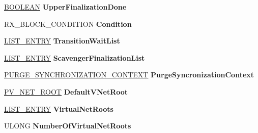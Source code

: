 \begin{DoxyCompactItemize}
\begin{tabbing}
\end{tabbing}\item 
\mbox{\label{struct___n_e_t___r_o_o_t_a55087becb2befd10856f97d06239aad6}} 
\hyperlink{_processor_bind_8h_a112e3146cb38b6ee95e64d85842e380a}{B\+O\+O\+L\+E\+AN} {\bfseries Upper\+Finalization\+Done}
\item 
\mbox{\label{struct___n_e_t___r_o_o_t_a96c908631dd527a2e1b5c10d39849bc3}} 
R\+X\+\_\+\+B\+L\+O\+C\+K\+\_\+\+C\+O\+N\+D\+I\+T\+I\+ON {\bfseries Condition}
\item 
\mbox{\label{struct___n_e_t___r_o_o_t_ab87260d2b31926640276a8044c64cace}} 
\hyperlink{struct___l_i_s_t___e_n_t_r_y}{L\+I\+S\+T\+\_\+\+E\+N\+T\+RY} {\bfseries Transition\+Wait\+List}
\item 
\mbox{\label{struct___n_e_t___r_o_o_t_a3838d38aee34eff37106d32ca253968a}} 
\hyperlink{struct___l_i_s_t___e_n_t_r_y}{L\+I\+S\+T\+\_\+\+E\+N\+T\+RY} {\bfseries Scavenger\+Finalization\+List}
\item 
\mbox{\label{struct___n_e_t___r_o_o_t_a68265088789984482137feb2bb67c995}} 
\hyperlink{struct___p_u_r_g_e___s_y_n_c_h_r_o_n_i_z_a_t_i_o_n___c_o_n_t_e_x_t}{P\+U\+R\+G\+E\+\_\+\+S\+Y\+N\+C\+H\+R\+O\+N\+I\+Z\+A\+T\+I\+O\+N\+\_\+\+C\+O\+N\+T\+E\+XT} {\bfseries Purge\+Syncronization\+Context}
\item 
\mbox{\label{struct___n_e_t___r_o_o_t_a180969c64da93d36e1ab4d5d71bd69b4}} 
\hyperlink{struct___v___n_e_t___r_o_o_t}{P\+V\+\_\+\+N\+E\+T\+\_\+\+R\+O\+OT} {\bfseries Default\+V\+Net\+Root}
\item 
\mbox{\label{struct___n_e_t___r_o_o_t_afdda9699edaa3fad8bfc8e95296a1c66}} 
\hyperlink{struct___l_i_s_t___e_n_t_r_y}{L\+I\+S\+T\+\_\+\+E\+N\+T\+RY} {\bfseries Virtual\+Net\+Roots}
\item 
\mbox{\label{struct___n_e_t___r_o_o_t_a784ea5f90c12709c2c4475e726b89be7}} 
U\+L\+O\+NG {\bfseries Number\+Of\+Virtual\+Net\+Roots}
\item 
\mbox{\label{struct___n_e_t___r_o_o_t_aa30c69a728d4827bf41ba4c1d273e9f7}} 

\end{DoxyCompactItemize}
